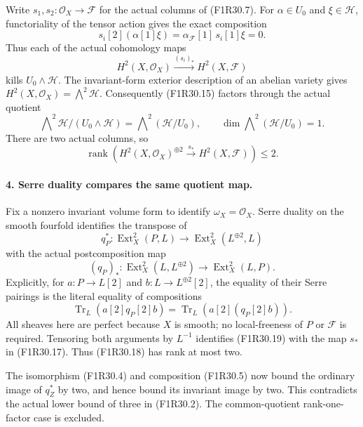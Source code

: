 Write $s_1,s_2:\mathcal O_X\to\mathcal F$
for the actual columns of (F1R30.7).
For $\alpha\in U_0$ and
$\xi\in\mathcal H$, functoriality of the
tensor action gives the exact composition
\[
 s_i[2](\alpha[1]\xi)
       =\alpha_{\mathcal F}[1]\,s_i[1]\xi=0.
 \tag{F1R30.14}
\]
Thus each of the actual cohomology
maps
\[
              H^2(X,\mathcal O_X)
                         \xrightarrow{(s_i)_*}H^2(X,\mathcal F)
 \tag{F1R30.15}
\]
kills $U_0\wedge\mathcal H$.
The invariant-form exterior description
of an abelian variety gives
$H^2(X,\mathcal O_X)=\bigwedge^2\mathcal H$.
Consequently (F1R30.15) factors through
the actual quotient
\[
 \bigwedge\nolimits^2\mathcal H/(U_0\wedge\mathcal H)
             =\bigwedge\nolimits^2(\mathcal H/U_0),
       \qquad
 \dim\bigwedge\nolimits^2(\mathcal H/U_0)=1.
 \tag{F1R30.16}
\]
There are two actual columns, so
\[
       \operatorname{rank}
       \left(H^2(X,\mathcal O_X)^{\oplus2}
                         \xrightarrow{s_*}H^2(X,\mathcal F)\right)
                                     \le2.
 \tag{F1R30.17}
\]

\paragraph{4. Serre duality compares the same quotient map.}
Fix a nonzero invariant volume form
to identify $\omega_X=\mathcal O_X$.
Serre duality on the smooth fourfold
identifies the transpose of
\[
 q_P^*:\operatorname{Ext}^2_X(P,L)
                  \longrightarrow\operatorname{Ext}^2_X(L^{\oplus2},L)
 \tag{F1R30.18}
\]
with the actual postcomposition map
\[
 (q_P)_*:\operatorname{Ext}^2_X(L,L^{\oplus2})
                   \longrightarrow\operatorname{Ext}^2_X(L,P).
 \tag{F1R30.19}
\]
Explicitly, for $a:P\to L[2]$ and
$b:L\to L^{\oplus2}[2]$, the equality
of their Serre pairings is the
literal equality of compositions
\[
 \operatorname{Tr}_L\!\left(a[2]q_P[2]b\right)
       =\operatorname{Tr}_L\!\left(a[2](q_P[2]b)\right).
 \tag{F1R30.20}
\]
All sheaves here are perfect because
$X$ is smooth; no local-freeness of
$P$ or $\mathcal F$ is required.
Tensoring both arguments by $L^{-1}$
identifies (F1R30.19) with the map
$s_*$ in (F1R30.17).
Thus (F1R30.18) has rank at most two.

The isomorphism (F1R30.4) and
composition (F1R30.5) now bound the
ordinary image of $q_Z^*$ by two,
and hence bound its invariant image
by two. This contradicts the actual
lower bound of three in (F1R30.2).
The common-quotient rank-one-factor
case is excluded.

